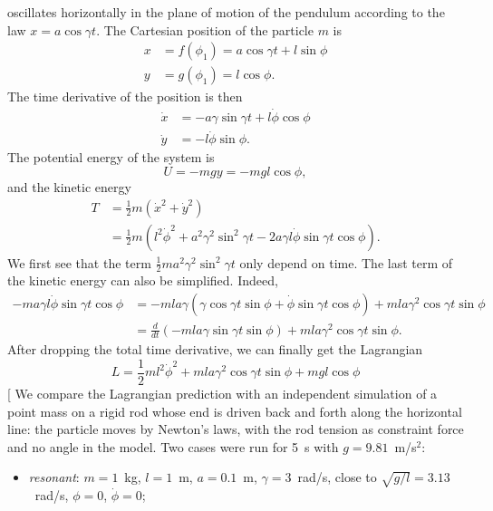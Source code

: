 \begin{subproblem}
{
oscillates horizontally in the plane of motion of the pendulum according to the law $x=a\cos{\gamma t}$.
}
{
The Cartesian position of the particle $m$ is
\begin{align*}
    x &= f(\phi_1) = a \cos{\gamma t} + l \sin{\phi} \\
    y &= g(\phi_1) = l \cos{\phi} .
\end{align*}
The time derivative of the position is then
\begin{align*}
    \Dot{x} &= -a \gamma \sin{\gamma t} + l \Dot{\phi} \cos{\phi} \\
    \Dot{y} &= - l \Dot{\phi} \sin{\phi} .
\end{align*}
The potential energy of the system is 
\begin{equation*}
    U = -mgy = -mgl\cos{\phi},
\end{equation*}
and the kinetic energy
\begin{align*}
    T &= \frac{1}{2} m (\Dot{x}^2 + \Dot{y}^2)\\
    &= \frac{1}{2} m \left(l^2\Dot{\phi}^2 + a^2\gamma^2\sin^2{\gamma t} - 2a\gamma l \Dot{\phi}\sin{\gamma t}\cos{\phi}\right).
\end{align*}
We first see that the term $\frac{1}{2} m a^2\gamma^2\sin^2{\gamma t}$ only depend on time. The last term of the kinetic energy can also be simplified. Indeed, 
\begin{align*}
      - m a\gamma l \Dot{\phi}\sin{\gamma t}\cos{\phi} &= 
      -m l a \gamma (\gamma \cos{\gamma t} \sin{\phi} + \Dot{\phi} \sin{\gamma t}\cos{\phi}) + m l a \gamma^2 \cos{\gamma t}\sin{\phi} \\
      &= \frac{d}{dt} \left( -mla\gamma\sin{\gamma t}\sin{\phi} \right) + m l a \gamma^2 \cos{\gamma t}\sin{\phi}.
\end{align*}
After dropping the total time derivative, we can finally get the Lagrangian
}
{
\begin{equation*}
    L = \frac{1}{2} m l^2\Dot{\phi}^2 + m l a \gamma^2 \cos{\gamma t}\sin{\phi}  + mgl\cos{\phi}
\end{equation*}
}
[
We compare the Lagrangian prediction with an independent simulation of a point mass on a rigid rod whose end is driven back and forth along the horizontal line: the particle moves by Newton's laws, with the rod tension as constraint force and no angle in the model. Two cases were run for 5~s with $g = 9.81$~m/s$^2$:
\begin{itemize}
    \item \emph{resonant}: $m = 1$~kg, $l = 1$~m, $a = 0.1$~m, $\gamma = 3$~rad/s, close to $\sqrt{g/l} = 3.13$~rad/s, $\phi = 0$, $\dot\phi = 0$;

\end{itemize}
\end{subproblem}
